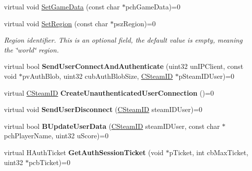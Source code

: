 \begin{DoxyCompactItemize}
\item 
virtual void \hyperlink{class_i_steam_game_server_ac49da636dd3719648ddf39e882fa9639}{Set\+Game\+Data} (const char $\ast$pch\+Game\+Data)=0
\item 
\mbox{\label{class_i_steam_game_server_aa4643622be52a83bc970a1804d92b9d6}} 
virtual void \hyperlink{class_i_steam_game_server_aa4643622be52a83bc970a1804d92b9d6}{Set\+Region} (const char $\ast$psz\+Region)=0
\begin{DoxyCompactList}\small\item\em Region identifier. This is an optional field, the default value is empty, meaning the \char`\"{}world\char`\"{} region. \end{DoxyCompactList}\item 
\mbox{\label{class_i_steam_game_server_a7b00dd07661cbf8706e5967a31091c5b}} 
virtual bool {\bfseries Send\+User\+Connect\+And\+Authenticate} (uint32 un\+I\+P\+Client, const void $\ast$pv\+Auth\+Blob, uint32 cub\+Auth\+Blob\+Size, \hyperlink{class_c_steam_i_d}{C\+Steam\+ID} $\ast$p\+Steam\+I\+D\+User)=0
\item 
\mbox{\label{class_i_steam_game_server_a9741aab97c7b44f7cfbefb80d7a0ecf8}} 
virtual \hyperlink{class_c_steam_i_d}{C\+Steam\+ID} {\bfseries Create\+Unauthenticated\+User\+Connection} ()=0
\item 
\mbox{\label{class_i_steam_game_server_acf9f1805ce1490ec87365487ccf3b238}} 
virtual void {\bfseries Send\+User\+Disconnect} (\hyperlink{class_c_steam_i_d}{C\+Steam\+ID} steam\+I\+D\+User)=0
\item 
\mbox{\label{class_i_steam_game_server_a21f5122161830a7fe1e28d72240e4162}} 
virtual bool {\bfseries B\+Update\+User\+Data} (\hyperlink{class_c_steam_i_d}{C\+Steam\+ID} steam\+I\+D\+User, const char $\ast$pch\+Player\+Name, uint32 u\+Score)=0
\item 
\mbox{\label{class_i_steam_game_server_aae0a37c9168a4802dcae8b2c055cfd36}} 
virtual H\+Auth\+Ticket {\bfseries Get\+Auth\+Session\+Ticket} (void $\ast$p\+Ticket, int cb\+Max\+Ticket, uint32 $\ast$pcb\+Ticket)=0
\item 
\mbox{\label{class_i_steam_game_server_ab0c4d1935e85463d701476761f0e05bb}} 

\end{DoxyCompactItemize}
